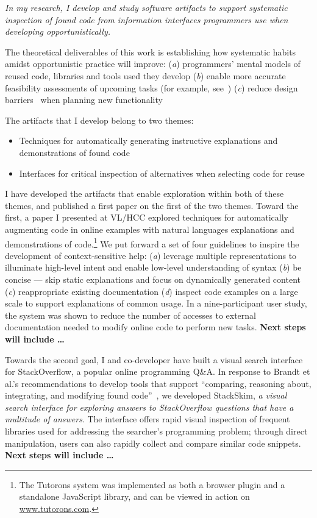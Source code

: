 \documentclass[12pt]{memoir}
\begin{document}
\emph{In my research, I develop and study software artifacts to support systematic inspection of found code from information interfaces programmers use when developing opportunistically.}

The theoretical deliverables of this work is establishing how systematic habits amidst opportunistic practice will improve:
(\emph{a}) programmers' mental models of reused code, libraries and tools used they develop
(\emph{b}) enable more accurate feasibility assessments of upcoming tasks (for example, see~\cite{ko_role_2011})
(\emph{c}) reduce design barriers~\cite{ko_six_2004} when planning new functionality

The artifacts that I develop belong to two themes:
\begin{itemize}[noitemsep]
\item Techniques for automatically generating instructive explanations and demonstrations of found code
\item Interfaces for critical inspection of alternatives when selecting code for reuse
\end{itemize}

I have developed the artifacts that enable exploration within both of these themes, and published a first paper on the first of the two themes.
Toward the first, a paper I presented at VL/HCC explored techniques for automatically augmenting code in online examples with natural languages explanations and demonstrations of code.\footnote{%
The Tutorons system was implemented as both a browser plugin and a standalone JavaScript library, and can be viewed in action on \url{www.tutorons.com}.
}
We put forward a set of four guidelines to inspire the development of context-sensitive help:
(\emph{a}) leverage multiple representations to illuminate high-level intent and enable low-level understanding of syntax
(\emph{b}) be concise --- skip static explanations and focus on dynamically generated content
(\emph{c}) reappropriate existing documentation
(\emph{d}) inspect code examples on a large scale to support explanations of common usage.
In a nine-participant user study, the system was shown to reduce the number of accesses to external documentation needed to modify online code to perform new tasks.
\textbf{Next steps will include \ldots}

Towards the second goal, I and co-developer have built a visual search interface for StackOverflow, a popular online programming Q\&A.
In response to Brandt et al.'s recommendations to develop tools that support ``comparing, reasoning about, integrating, and modifying found code''~\cite{brandt_opportunistic_2008}, we developed StackSkim, \emph{a visual search interface for exploring answers to StackOverflow questions that have a multitude of answers}.
The interface offers rapid visual inspection of frequent libraries used for addressing the searcher's programming problem;
through direct manipulation, users can also rapidly collect and compare similar code snippets.
\textbf{Next steps will include \ldots}
\end{document}
